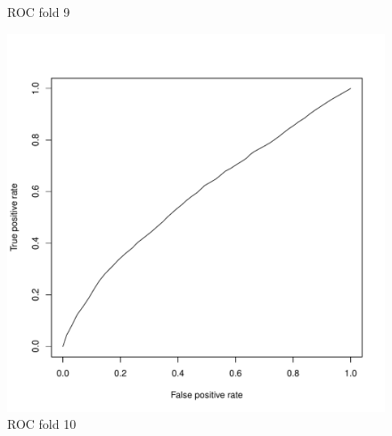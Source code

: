 \documentclass{article}\usepackage[]{graphicx}\usepackage[]{color}
\begin{document}
\begin{figure}[h]
  \caption{ROC fold 9}\label{}
\endminipage\hfill
{}%
  \includegraphics[width=\linewidth]{ROC_block10.pdf}
  \caption{ROC fold 10}\label{}
\endminipage
\end{figure}
\end{document}
